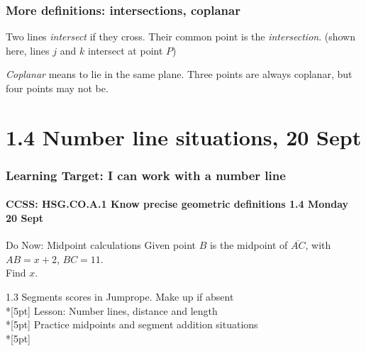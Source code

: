 \documentclass{beamer}
\begin{document}
\frame
{
\frametitle{More definitions: intersections, coplanar}
Two lines \emph{intersect} if they cross. Their common point is the \emph{intersection}. 
(shown here, lines $j$ and $k$ intersect at point $P$)
\begin{center}
  \end{center}
  \emph{Coplanar} means to lie in the same plane. Three points are always coplanar, but four points may not be. \\[0.15in]
  \begin{center}
\end{center}
}

  \section{1.4 Number line situations, 20 Sept}
  \frame
  {
    \frametitle{Learning Target: I can work with a number line}
    \framesubtitle{CCSS: HSG.CO.A.1 Know precise geometric definitions  \hfill \alert{1.4 Monday 20 Sept}}
  
    \begin{block}{Do Now: Midpoint calculations}
      Given point $B$ is the midpoint of $\overline{AC}$, with $AB=x+2$, $BC=11$. \\
      Find $x$.
        \begin{center}
        \end{center}
    \end{block}
    1.3 Segments scores in Jumprope. Make up if absent \\*[5pt]
    Lesson: Number lines, distance and length \\*[5pt]
    Practice midpoints and segment addition situations \\*[5pt]
  }
\end{document}
